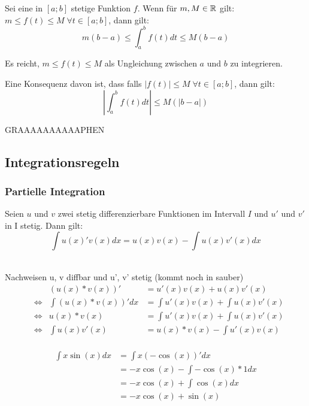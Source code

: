\begin{Theorem}
  Sei eine in $[a;b]$ stetige Funktion $f$. Wenn für $m,M \in \mathbb{R}$ gilt: $m\leq f(t) \leq M \; \forall t \in [a;b]$, dann gilt:
  $$m(b-a) \leq \int_a^b f(t)dt \leq M(b-a)$$
\end{Theorem}
\begin{Beweis}
  Es reicht, $m \leq f(t) \leq M$ als Ungleichung zwischen $a$ und $b$ zu integrieren.
\end{Beweis}
\begin{Bemerkung}
  Eine Konsequenz davon ist, dass falls $|f(t)|\leq M \; \forall t \in [a;b]$, dann gilt:
  $$|\int_a^b f(t)dt | \leq M(|b-a|)$$
\end{Bemerkung}
GRAAAAAAAAAAPHEN
\subsection{Integrationsregeln}
\subsubsection{Partielle Integration}
\begin{Theorem}
  Seien $u$ und $v$ zwei stetig differenzierbare Funktionen im Intervall $I$ und $u'$
  und $v'$ in I stetig. Dann gilt:
  $$\int u(x)'v(x) dx= u(x)v(x) - \int u(x)v'(x) dx$$
\end{Theorem}
\begin{Beweis}\\
Nachweisen u, v diffbar und u', v' stetig (kommt noch in sauber)\\
\begin{align*}
  &&(u(x)*v(x))' &= u'(x)v(x)+u(x)v'(x)\\
  &\Leftrightarrow & \int (u(x)*v(x))' dx &= \int u'(x)v(x)+\int u(x)v'(x)\\
  &\Leftrightarrow & u(x)*v(x) &= \int u'(x)v(x)+\int u(x)v'(x)\\
  &\Leftrightarrow & \int u(x)v'(x) &= u(x)*v(x)- \int u'(x)v(x)\\
\end{align*}
\end{Beweis}
\begin{Beispiel}
  \begin{align*}
  \int x\sin(x) dx &= \int x(-\cos(x))' dx\\
  &= -x\cos(x) - \int-\cos(x)*1 dx\\
  &= -x\cos(x) + \int\cos(x) dx\\
  &= -x\cos(x) + \sin(x)
\end{align*}
\end{Beispiel}
